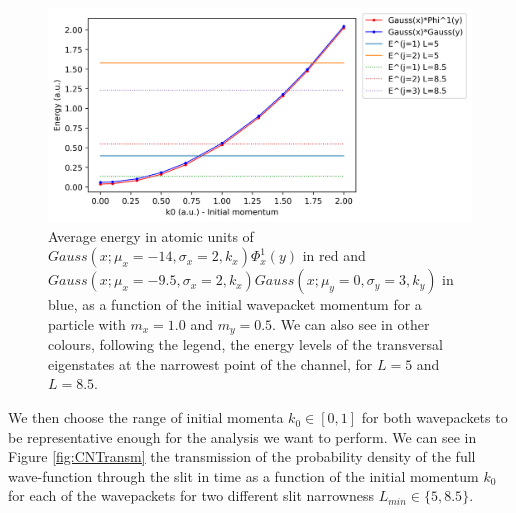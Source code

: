 \documentclass[11pt, a4paper]{article} %
\begin{document}
\begin{figure}[h!]
  \centering
    \includegraphics[width=0.7\linewidth]{Evsk_GS_GG_L8_5.png}
  \caption{Average energy in atomic units of $Gauss(x;\mu_x=-14, \sigma_x=2, k_x)\Phi^1_x(y)$ in red and $Gauss(x;\mu_x=-9.5, \sigma_x=2, k_x)Gauss(x;\mu_y=0, \sigma_y=3, k_y)$ in blue, as a function of the initial wavepacket momentum for a particle with $m_x=1.0$ and $m_y=0.5$. We can also see in other colours, following the legend, the energy levels of the transversal eigenstates at the narrowest point of the channel, for $L=5$ and $L=8.5$.}
  \label{fig:energies}
\end{figure}


We then choose the range of initial momenta $ k_0 \in [ 0,1 ]$ for both wavepackets to be representative enough for the analysis we want to perform.  We can see in Figure \ref{fig:CNTransm} the transmission of the probability density of the full wave-function through the slit in time as a function of the initial momentum $k_0$ for each of the wavepackets for two different slit narrowness $L_{min}\in\{5, 8.5\}$.
\end{document}
